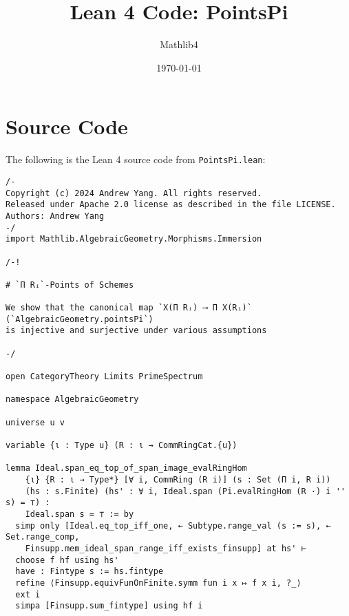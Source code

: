 \documentclass{article}
\title{Lean 4 Code: PointsPi}
\author{Mathlib4}
\date{\today}
\begin{document}
\maketitle

\section{Source Code}

The following is the Lean 4 source code from \texttt{PointsPi.lean}:

\begin{lstlisting}[language=Lean, caption={PointsPi.lean}]
/-
Copyright (c) 2024 Andrew Yang. All rights reserved.
Released under Apache 2.0 license as described in the file LICENSE.
Authors: Andrew Yang
-/
import Mathlib.AlgebraicGeometry.Morphisms.Immersion

/-!

# `Π Rᵢ`-Points of Schemes

We show that the canonical map `X(Π Rᵢ) ⟶ Π X(Rᵢ)` (`AlgebraicGeometry.pointsPi`)
is injective and surjective under various assumptions

-/

open CategoryTheory Limits PrimeSpectrum

namespace AlgebraicGeometry

universe u v

variable {ι : Type u} (R : ι → CommRingCat.{u})

lemma Ideal.span_eq_top_of_span_image_evalRingHom
    {ι} {R : ι → Type*} [∀ i, CommRing (R i)] (s : Set (Π i, R i))
    (hs : s.Finite) (hs' : ∀ i, Ideal.span (Pi.evalRingHom (R ·) i '' s) = ⊤) :
    Ideal.span s = ⊤ := by
  simp only [Ideal.eq_top_iff_one, ← Subtype.range_val (s := s), ← Set.range_comp,
    Finsupp.mem_ideal_span_range_iff_exists_finsupp] at hs' ⊢
  choose f hf using hs'
  have : Fintype s := hs.fintype
  refine ⟨Finsupp.equivFunOnFinite.symm fun i x ↦ f x i, ?_⟩
  ext i
  simpa [Finsupp.sum_fintype] using hf i


\end{lstlisting}
\end{document}
